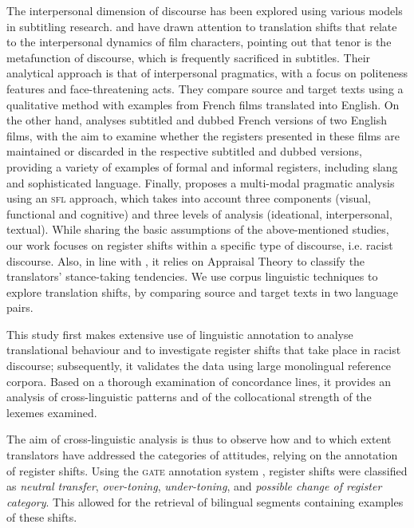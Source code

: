 \documentclass[output=paper]{LSP/langsci}
\begin{document}
The interpersonal dimension of discourse has been explored using various models in subtitling research. \citet[78--96]{Hatim1997} and \citet{Mason2001} have drawn attention to translation shifts that relate to the interpersonal dynamics of film characters, pointing out that tenor is the metafunction of discourse, which is frequently sacrificed in subtitles. Their analytical approach is that of interpersonal pragmatics, with a focus on politeness features and face-threatening acts. They compare source and target texts using a qualitative method with examples from French films translated into English. On the other hand, \citet{Pettit2005} analyses subtitled and dubbed French versions of two English films, with the aim to examine whether the registers presented in these films are maintained or discarded in the respective subtitled and dubbed versions, providing a variety of examples of formal and informal registers, including slang and sophisticated language. Finally, \citet{Mubenga2009} proposes a multi-modal pragmatic analysis using an \textsc{sfl} approach, which takes into account three components (visual, functional and cognitive) and three levels of analysis (ideational, interpersonal, textual). While sharing the basic assumptions of the above-mentioned studies, our work focuses on register shifts within a specific type of discourse, i.e. racist discourse. Also, in line with \citet{Munday2012}, it relies on Appraisal Theory to classify the translators' stance-taking tendencies. We use corpus linguistic techniques to explore translation shifts, by comparing source and target texts in two language pairs.

This study first makes extensive use of linguistic annotation to analyse translational behaviour and to investigate register shifts that take place in racist discourse; subsequently, it validates the data using large monolingual reference corpora. Based on a thorough examination of concordance lines, it provides an analysis of cross-linguistic patterns and of the collocational strength of the lexemes examined.

The aim of cross-linguistic analysis is thus to observe how and to which extent translators have addressed the categories of attitudes, relying on the annotation of register shifts. Using the \textsc{gate} annotation system \citep{Cunningham2002}, register shifts were classified as \textit{neutral transfer}, \textit{over-toning}, \textit{under-toning}, and \textit{possible change of register category}. This allowed for the retrieval of bilingual segments containing examples of these shifts.
\end{document}
